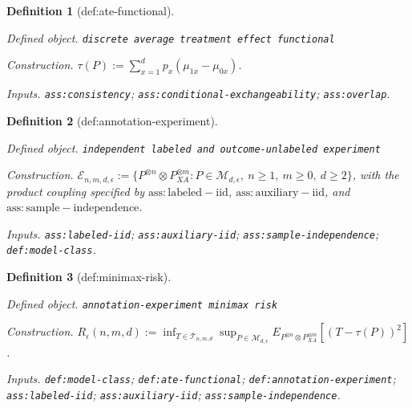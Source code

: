 \documentclass{article}
\newtheorem{definition}{Definition}
\begin{document}
\begin{definition}[def:ate-functional]\label{def:ate-functional}
\par\smallskip\noindent\emph{Defined object.} \texttt{discrete average treatment effect functional}
\par\smallskip\noindent\emph{Construction.} \(\tau(P):=\sum_{x=1}^{d}p_x(\mu_{1x}-\mu_{0x})\).
\par\smallskip\noindent\emph{Inputs.} \texttt{ass:\allowbreak{}consistency}; \texttt{ass:\allowbreak{}conditional-\allowbreak{}exchangeability}; \texttt{ass:\allowbreak{}overlap}.
\end{definition}

\begin{definition}[def:annotation-experiment]\label{def:annotation-experiment}
\par\smallskip\noindent\emph{Defined object.} \texttt{independent labeled and outcome-\allowbreak{}unlabeled experiment}
\par\smallskip\noindent\emph{Construction.} \(\mathcal E_{n,m,d,\epsilon}:=\{P^{\otimes n}\otimes P_{XA}^{\otimes m}:P\in\mathcal M_{d,\epsilon},\ n\ge1,\ m\ge0,\ d\ge2\}\), with the product coupling specified by \(\mathrm{ass:labeled-iid}\), \(\mathrm{ass:auxiliary-iid}\), and \(\mathrm{ass:sample-independence}\).
\par\smallskip\noindent\emph{Inputs.} \texttt{ass:\allowbreak{}labeled-\allowbreak{}iid}; \texttt{ass:\allowbreak{}auxiliary-\allowbreak{}iid}; \texttt{ass:\allowbreak{}sample-\allowbreak{}independence}; \texttt{def:\allowbreak{}model-\allowbreak{}class}.
\end{definition}

\begin{definition}[def:minimax-risk]\label{def:minimax-risk}
\par\smallskip\noindent\emph{Defined object.} \texttt{annotation-\allowbreak{}experiment minimax risk}
\par\smallskip\noindent\emph{Construction.} \(R_\epsilon(n,m,d):=\inf_{T\in\mathcal T_{n,m,d}}\sup_{P\in\mathcal M_{d,\epsilon}}E_{P^{\otimes n}\otimes P_{XA}^{\otimes m}}[(T-\tau(P))^2]\).
\par\smallskip\noindent\emph{Inputs.} \texttt{def:\allowbreak{}model-\allowbreak{}class}; \texttt{def:\allowbreak{}ate-\allowbreak{}functional}; \texttt{def:\allowbreak{}annotation-\allowbreak{}experiment}; \texttt{ass:\allowbreak{}labeled-\allowbreak{}iid}; \texttt{ass:\allowbreak{}auxiliary-\allowbreak{}iid}; \texttt{ass:\allowbreak{}sample-\allowbreak{}independence}.
\end{definition}
\end{document}
